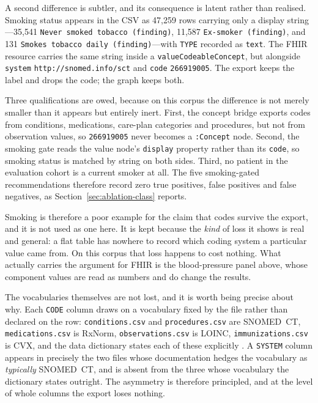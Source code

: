 A second difference is subtler, and its consequence is latent rather than realised. Smoking
status appears in the CSV as 47{,}259 rows carrying only a display
string---35{,}541 \texttt{Never smoked tobacco (finding)}, 11{,}587
\texttt{Ex-smoker (finding)}, and 131 \texttt{Smokes tobacco daily
(finding)}---with \texttt{TYPE} recorded as \texttt{text}. The FHIR resource carries the same
string inside a \texttt{valueCodeableConcept}, but alongside \texttt{system}
\texttt{http://snomed.info/sct} and \texttt{code} \texttt{266919005}. The export keeps the
label and drops the code; the graph keeps both.

Three qualifications are owed, because on this corpus the difference is not merely smaller than
it appears but entirely inert. First, the concept bridge exports codes from conditions, medications, care-plan categories
and procedures, but not from observation values, so \texttt{266919005} never becomes a
\texttt{:Concept} node. Second, the smoking gate reads the value node's \texttt{display}
property rather than its \texttt{code}, so smoking status is matched by string on both
sides. Third, no patient in the evaluation cohort is a current smoker at all. The five
smoking-gated recommendations therefore record zero true positives, false positives and
false negatives, as Section~\ref{sec:ablation-class} reports.

Smoking is therefore a poor example for the claim that codes survive the
export, and it is not used as one here. It is kept because the \emph{kind} of loss it shows is
real and general: a flat table has nowhere to record which coding system a particular value
came from. On this corpus that loss happens to cost nothing. What actually carries the argument
for FHIR is the blood-pressure panel above, whose component values are read as numbers and do
change the results.

The vocabularies themselves are not lost, and it is worth being precise about why. Each
\texttt{CODE} column draws on a vocabulary fixed by the file rather than declared on the row:
\texttt{conditions.csv} and \texttt{procedures.csv} are SNOMED~CT, \texttt{medications.csv} is
RxNorm, \texttt{observations.csv} is LOINC, \texttt{immunizations.csv} is CVX, and the data
dictionary states each of these explicitly \cite{synthea_csv_dict}. A \texttt{SYSTEM} column
appears in precisely the two files whose documentation hedges the vocabulary as
\emph{typically} SNOMED~CT, and is absent from the three whose vocabulary the dictionary states
outright. The asymmetry is therefore principled, and at the level of whole columns the export
loses nothing.

